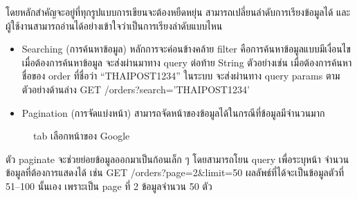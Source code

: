 \documentclass[14pt,oneside,openright,a4paper]{cpe-thai-project}
\begin{document}
\begin{enumerate}
\begin{itemize}
      \end{itemize}

โดยหลักสำคัญจะอยู่ที่ทุกรูปแบบการเขียนจะต้องหยืดหยุ่น สามารถเปลี่ยนลำดับการเรียงข้อมูลได้ และผู้ใช้งานสามารถอ่านได้อย่างเข้าใจว่าเป็นการเรียงลำดับแบบไหน

          \begin{itemize} 
            \item Searching (การค้นหาข้อมูล) หลักการจะค่อนข้างคล้าย filter คือการค้นหาข้อมูลแบบมีเงื่อนไข เมื่อต้องการค้นหาข้อมูล จะส่งผ่านมาทาง query ต่อท้าย String ตัวอย่างเช่น เมื่อต้องการค้นหาชื่อของ order ที่ชื่อว่า “THAIPOST1234” ในระบบ จะส่งผ่านทาง query params ตามตัวอย่างด้านล่าง
              GET /orders?search='THAIPOST1234' \\ 
            \item Pagination (การจัดแบ่งหน้า) \cite{Pagination} สามารถจัดหน้าของข้อมูลได้ในกรณีที่ข้อมูลมีจำนวนมาก
          \end{itemize}

            \begin{figure}[!h]\centering
              \setlength{\fboxrule}{0.5mm} %
              \setlength{\fboxsep}{0.5cm}
              \caption{tab เลือกหน้าของ Google}\label{fig:google}
            \end{figure}

ตัว paginate จะช่วยย่อยข้อมูลออกมาเป็นก้อนเล็ก ๆ โดยสามารถโยน query เพื่อระบุหน้า จำนวนข้อมูลที่ต้องการแสดงได้ เช่น GET /orders?page=2\&limit=50
ผลลัพธ์ที่ได้จะเป็นข้อมูลตัวที่ 51–100 นั้นเอง เพราะเป็น page ที่ 2 ข้อมูลจำนวน 50 ตัว


\end{enumerate}
\end{document}

